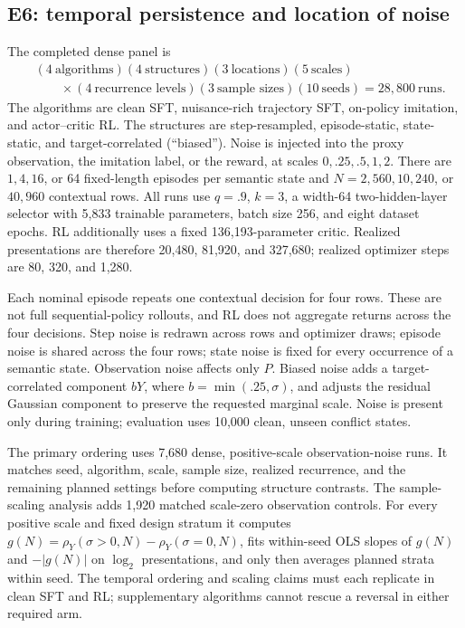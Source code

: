 \documentclass[11pt,a4paper]{article}
\newcommand{\rhoY}{\rho_Y}
\begin{document}
\subsection{E6: temporal persistence and location of noise}

The completed dense panel is
\[
\begin{aligned}
&(4\ \text{algorithms})(4\ \text{structures})(3\ \text{locations})(5\ \text{scales})\\
&\qquad\times(4\ \text{recurrence levels})(3\ \text{sample sizes})(10\ \text{seeds})
=28{,}800\ \text{runs}.
\end{aligned}
\]
The algorithms are clean SFT, nuisance-rich trajectory SFT, on-policy imitation, and actor--critic RL. The structures are step-resampled, episode-static, state-static, and target-correlated (``biased''). Noise is injected into the proxy observation, the imitation label, or the reward, at scales $0,.25,.5,1,2$. There are $1,4,16$, or 64 fixed-length episodes per semantic state and $N=2{,}560,10{,}240$, or $40{,}960$ contextual rows. All runs use $q=.9$, $k=3$, a width-64 two-hidden-layer selector with 5,833 trainable parameters, batch size 256, and eight dataset epochs. RL additionally uses a fixed 136,193-parameter critic. Realized presentations are therefore 20,480, 81,920, and 327,680; realized optimizer steps are 80, 320, and 1,280.

Each nominal episode repeats one contextual decision for four rows. These are not full sequential-policy rollouts, and RL does not aggregate returns across the four decisions. Step noise is redrawn across rows and optimizer draws; episode noise is shared across the four rows; state noise is fixed for every occurrence of a semantic state. Observation noise affects only $P$. Biased noise adds a target-correlated component $bY$, where $b=\min(.25,\sigma)$, and adjusts the residual Gaussian component to preserve the requested marginal scale. Noise is present only during training; evaluation uses 10,000 clean, unseen conflict states.

The primary ordering uses 7,680 dense, positive-scale observation-noise runs. It matches seed, algorithm, scale, sample size, realized recurrence, and the remaining planned settings before computing structure contrasts. The sample-scaling analysis adds 1,920 matched scale-zero observation controls. For every positive scale and fixed design stratum it computes $g(N)=\rhoY(\sigma>0,N)-\rhoY(\sigma=0,N)$, fits within-seed OLS slopes of $g(N)$ and $-|g(N)|$ on $\log_2$ presentations, and only then averages planned strata within seed. The temporal ordering and scaling claims must each replicate in clean SFT and RL; supplementary algorithms cannot rescue a reversal in either required arm.
\end{document}
